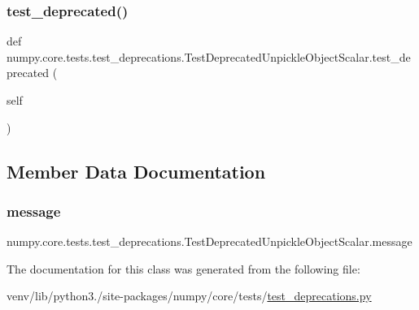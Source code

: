 \subsubsection{\texorpdfstring{test\+\_\+deprecated()}{test\_deprecated()}}
{\footnotesize\ttfamily def numpy.\+core.\+tests.\+test\+\_\+deprecations.\+Test\+Deprecated\+Unpickle\+Object\+Scalar.\+test\+\_\+deprecated (\begin{DoxyParamCaption}\item[{}]{self }\end{DoxyParamCaption})}



\subsection{Member Data Documentation}
\mbox{\label{classnumpy_1_1core_1_1tests_1_1test__deprecations_1_1TestDeprecatedUnpickleObjectScalar_a5de721c377d7f6cb31cf2a4e2718a2f1}} 
\subsubsection{\texorpdfstring{message}{message}}
{\footnotesize\ttfamily numpy.\+core.\+tests.\+test\+\_\+deprecations.\+Test\+Deprecated\+Unpickle\+Object\+Scalar.\+message\hspace{0.3cm}{\ttfamily [static]}}



The documentation for this class was generated from the following file\+:\begin{DoxyCompactItemize}
\item 
venv/lib/python3./site-\/packages/numpy/core/tests/\hyperlink{core_2tests_2test__deprecations_8py}{test\+\_\+deprecations.\+py}\end{DoxyCompactItemize}
